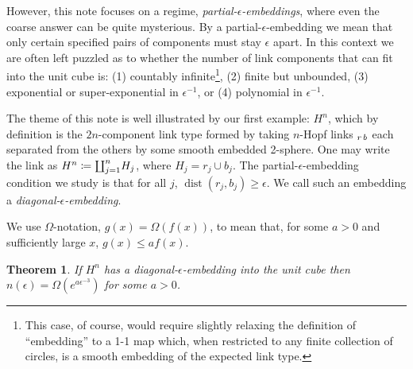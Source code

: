\documentclass[12pt]{amsart}
\DeclareMathOperator{\dist}{dist}
\renewcommand{\coprod}{\rotatebox[origin = c]{180}{$\prod$}}
\newtheorem{thm}{Theorem}
\theoremstyle{definition}
\theoremstyle{remark}
\begin{document}
However, this note focuses on a regime, \emph{partial-$\epsilon$-embeddings}, where even the coarse answer can be quite mysterious. By a partial-$\epsilon$-embedding we mean that only certain specified pairs of components must stay $\epsilon$ apart. In this context we are often left puzzled as to whether the number of link components that can fit into the unit cube is: (1) countably infinite\footnote{This case, of course, would require slightly relaxing the definition of ``embedding'' to a 1-1 map which, when restricted to any finite collection of circles, is a smooth embedding of the expected link type.}, (2) finite but unbounded, (3) exponential or super-exponential in $\epsilon^{-1}$, or (4) polynomial in $\epsilon^{-1}$.

The theme of this note is well illustrated by our first example: $H^n$, which by definition is the $2n$-component link type formed by taking $n$-Hopf links $\vphantom{l}_r$$\vphantom{l}_b$ each separated from the others by some smooth embedded 2-sphere. One may write the link as $H^n \coloneqq \coprod_{j=1}^n H_j$, where $H_j = r_j \cup b_j$. The partial-$\epsilon$-embedding condition we study is that for all $j$, $\dist(r_j, b_j) \geq \epsilon$. We call such an embedding a \emph{diagonal-$\epsilon$-embedding}.

We use $\Omega$-notation, $g(x) = \Omega(f(x))$, to mean that, for some $a > 0$ and sufficiently large $x$, $g(x) \leq af(x)$.

\begin{thm}\label{thm:diagonal-embed}
	If $H^n$ has a diagonal-$\epsilon$-embedding into the unit cube then $n(\epsilon) = \Omega\left(e^{a\epsilon^{-3}}\right)$ for some $a > 0$.
\end{thm}
\end{document}
